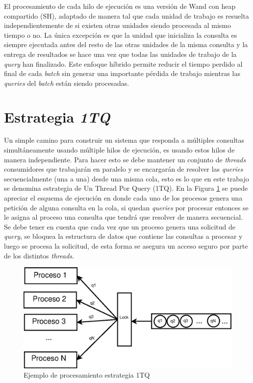 El procesamiento de cada hilo de ejecución es una versión de Wand con heap compartido (SH), adaptado de manera tal que cada unidad de trabajo es resuelta independientemente de si existen otras unidades siendo procesada al mismo tiempo o no. La única excepción es que la unidad que inicializa la consulta es siempre ejecutada antes del resto de las otras unidades de la misma consulta y la entrega de resultados se hace una vez que todas las unidades de trabajo de la \textit{query} han finalizado. Este enfoque híbrido permite reducir el tiempo perdido al final de cada \textit{batch} sin generar una importante pérdida de trabajo mientras las \textit{queries} del \textit{batch} están siendo procesadas.



\section{Estrategia \textit{1TQ}}
\label{scheduling:baseline}
Un simple camino para construir un sistema que responda a múltiples consultas simultáneamente usando múltiple hilos de ejecución, es usando estos hilos de manera independiente. Para hacer esto se debe mantener un conjunto de \textit{threads} consumidores que trabajarán en paralelo y se encargarán de resolver las \textit{queries} secuencialmente (una a una) desde una misma cola, esto es lo que en este trabajo se denomina estrategia de Un Thread Por Query (1TQ). En la Figura \ref{fig:1TQ} se puede apreciar el esquema de ejecución en donde cada uno de los procesos genera una petición de alguna consulta en la cola, si quedan \textit{queries} por procesar entonces se le asigna al proceso una consulta que tendrá que resolver de manera secuencial. Se debe tener en cuenta que cada vez que un proceso genera una solicitud de \textit{query}, se bloquea la estructura de datos que contiene las consultas a procesar y luego se procesa la solicitud, de esta forma se asegura un acceso seguro por parte de los distintos \textit{threads}. 

\begin{figure}[H]
\centering
\includegraphics[scale=.75]{images/1TQ.eps}
\caption{Ejemplo de procesamiento estrategia 1TQ}
\label{fig:1TQ}
\end{figure}

